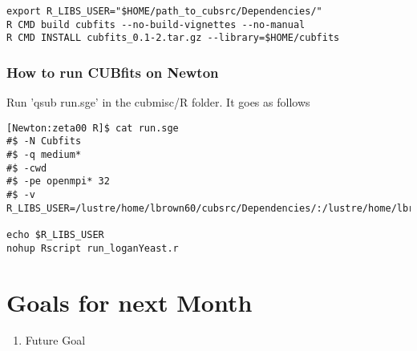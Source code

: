 \begin{verbatim}
export R_LIBS_USER="$HOME/path_to_cubsrc/Dependencies/"
R CMD build cubfits --no-build-vignettes --no-manual
R CMD INSTALL cubfits_0.1-2.tar.gz --library=$HOME/cubfits
\end{verbatim}

\subsubsection{How to run CUBfits on Newton}

Run 'qsub run.sge' in the cubmisc/R folder. It goes as follows 
\begin{verbatim}
[Newton:zeta00 R]$ cat run.sge
#$ -N Cubfits
#$ -q medium*
#$ -cwd
#$ -pe openmpi* 32
#$ -v R_LIBS_USER=/lustre/home/lbrown60/cubsrc/Dependencies/:/lustre/home/lbrown60/cubfits

echo $R_LIBS_USER
nohup Rscript run_loganYeast.r
\end{verbatim}

\section{Goals for next Month}
\begin{enumerate}
\item Future Goal
\end{enumerate}


